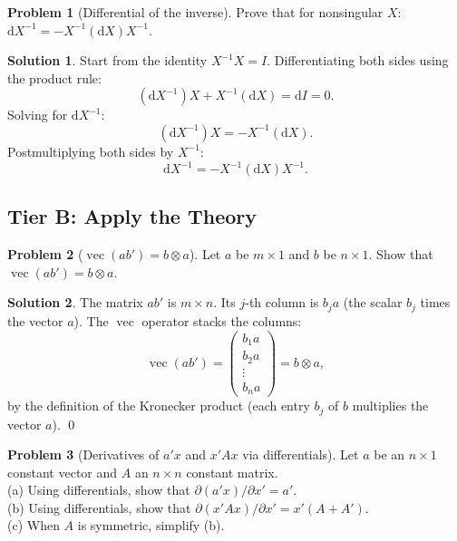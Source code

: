 \documentclass[12pt,a4paper]{article}
\theoremstyle{definition}
\newtheorem{exercise}{Problem}
\newtheorem*{solution*}{Solution}
\DeclareMathOperator{\avec}{vec}
\newcommand{\dd}{\mathrm{d}}
\begin{document}
\begin{exercise}[Differential of the inverse]\label{mc:A6}
Prove that for nonsingular $X$: $\dd X^{-1} = -X^{-1}(\dd X)X^{-1}$.
\end{exercise}

\begin{solution*}
Start from the identity $X^{-1}X = I$. Differentiating both sides using the product rule:
\[
(\dd X^{-1})X + X^{-1}(\dd X) = \dd I = 0.
\]
Solving for $\dd X^{-1}$:
\[
(\dd X^{-1})X = -X^{-1}(\dd X).
\]
Postmultiplying both sides by $X^{-1}$:
\[
\dd X^{-1} = -X^{-1}(\dd X) X^{-1}. \tag*{\qed}
\]
\end{solution*}

\subsection*{Tier B: Apply the Theory}

\begin{exercise}[$\avec(ab') = b \otimes a$]\label{mc:B1}
Let $a$ be $m \times 1$ and $b$ be $n \times 1$. Show that $\avec(ab') = b \otimes a$.
\end{exercise}

\begin{solution*}
The matrix $ab'$ is $m \times n$. Its $j$-th column is $b_j a$ (the scalar $b_j$ times the vector $a$). The $\avec$ operator stacks the columns:
\[
\avec(ab') = \begin{pmatrix} b_1 a \\ b_2 a \\ \vdots \\ b_n a \end{pmatrix} = b \otimes a,
\]
by the definition of the Kronecker product (each entry $b_j$ of $b$ multiplies the vector $a$). \qed
\end{solution*}

\begin{exercise}[Derivatives of $a'x$ and $x'Ax$ via differentials]\label{mc:B2}
Let $a$ be an $n \times 1$ constant vector and $A$ an $n \times n$ constant matrix.\\
(a) Using differentials, show that $\partial(a'x)/\partial x' = a'$.\\
(b) Using differentials, show that $\partial(x'Ax)/\partial x' = x'(A + A')$.\\
(c) When $A$ is symmetric, simplify (b).
\end{exercise}
\end{document}

